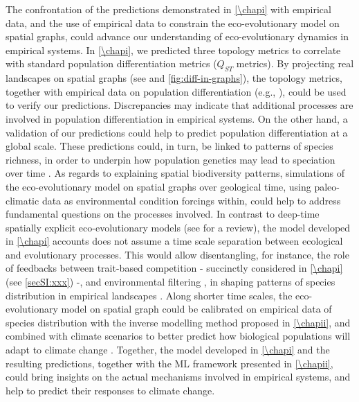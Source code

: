 The confrontation of the predictions demonstrated in \cref{\chapi} with empirical data, and the use of empirical data to constrain the eco-evolutionary model on spatial graphs, could advance our understanding of eco-evolutionary dynamics in empirical systems.
% 
In \cref{\chapi}, we predicted three topology metrics to correlate with standard population differentiation metrics ($Q_{ST}$ metrics). By projecting real landscapes on spatial graphs (see \cite{Dale2010} and \cref{fig:diff-in-graphs}), the topology metrics, together with empirical data on population differentiation (e.g., \citep{Manel2003}), could be used to verify our predictions. Discrepancies may indicate that additional processes are involved in population differentiation in empirical systems. On the other hand, a validation of our predictions could help to predict population differentiation at a global scale. These predictions could, in turn, be linked to patterns of species richness, in order to underpin how population genetics may lead to speciation over time \citep{Templeton1981}.
% 
As regards to explaining spatial biodiversity patterns, simulations of the eco-evolutionary model on spatial graphs over geological time, using paleo-climatic data \citep{STRAUME2020126} as environmental condition forcings within, could help to address fundamental questions on the processes involved. In contrast to deep-time spatially explicit eco-evolutionary models (see \cite{Hagen2022} for a review), the model developed in \cref{\chapi} accounts does not assume a time scale separation between ecological and evolutionary processes.
% 
This would allow disentangling, for instance, the role of feedbacks between trait-based competition \citep{Dieckmann1999} - succinctly considered in \cref{\chapi} (see \cref{secSI:xxx}) -, and environmental filtering \citep{Doebeli2003}, in shaping patterns of species distribution in empirical landscapes \cite{Rahbek2019a}. %
% 
Along shorter time scales, the eco-evolutionary model on spatial graph could be calibrated on empirical data of species distribution \cite{Abegg2020,GBIF:TheGlobalBiodiversityInformationFacility2022} with the inverse modelling method proposed in \cref{\chapii}, and combined with climate scenarios \citep{Kriticos2012} to better predict how biological populations will adapt to climate change \citep{Norberg2012,Urban2016}.
% 
Together, the model developed in \cref{\chapi} and the resulting predictions, together with the ML framework presented in \cref{\chapii}, could bring insights on the actual mechanisms involved in empirical systems, and help to predict their responses to climate change. 


